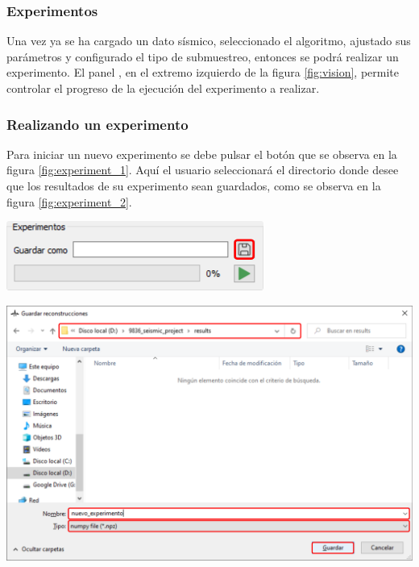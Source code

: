 \documentclass[12pt,twoside,letter]{ol-softwaremanual}
\newcommand*\circled[1]{\tikz[baseline=(char.base)]{
            \node[shape=circle,draw,inner sep=2pt] (char) {#1};}}
\newenvironment{Figure}
  {\par\medskip\noindent\minipage{\linewidth}}
  {\endminipage\par\medskip}
\begin{document}
\subsubsection{Experimentos}
\label{sec:experiment}

Una vez ya se ha cargado un dato sísmico, seleccionado el algoritmo, ajustado sus parámetros y configurado el tipo de submuestreo, entonces se podrá realizar un experimento. El panel \circled{5}, en el extremo izquierdo de la figura \ref{fig:vision}, permite controlar el progreso de la ejecución del experimento a realizar.

\subsubsection*{Realizando un experimento}

\begin{multicols}{2}

Para iniciar un nuevo experimento se debe pulsar el botón \hspace{0.5mm} \faSave \hspace{0.5mm} que se observa en la figura \ref{fig:experiment_1}. Aquí el usuario seleccionará el directorio donde desee que los resultados de su experimento sean guardados, como se observa en la figura \ref{fig:experiment_2}.

\begin{Figure}
    \vspace{5mm}
    \centering
    \includegraphics[width=0.8\linewidth]{experiment-1.png}
    \label{fig:experiment_1}
\end{Figure}

\end{multicols}

\begin{Figure}
    \centering
    \includegraphics[width=1\linewidth]{experiment-2.png}
    \label{fig:experiment_2}
\end{Figure}
\end{document}
